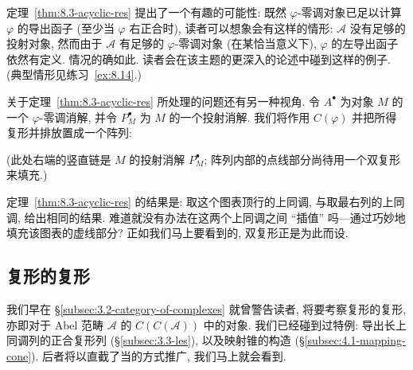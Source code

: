 定理~\ref{thm:8.3-acyclic-res} 提出了一个有趣的可能性: 既然 $\varphi$-零调对象已足以计算 $\varphi$ 的导出函子 (至少当 $\varphi$ 右正合时), 读者可以想象会有这样的情形: $\mathcal{A}$ 没有足够的投射对象, 然而由于 $\mathcal{A}$ 有足够的 $\varphi$-零调对象 (在某恰当意义下), $\varphi$ 的左导出函子依然有定义. 情况的确如此. 读者会在该主题的更深入的论述中碰到这样的例子. (典型情形见练习~\ref{ex:8.14}.)

关于定理~\ref{thm:8.3-acyclic-res} 所处理的问题还有另一种视角. 令 $A^\bullet$ 为对象 $M$ 的一个 $\varphi$-零调消解, 并令 $P_M^\bullet$ 为 $M$ 的一个投射消解. 我们将作用 $C(\varphi)$ 并把所得复形并排放置成一个阵列:

\begin{center}
\end{center}

\noindent (此处右端的竖直链是 $M$ 的投射消解 $P_M^\bullet$; 阵列内部的点线部分尚待用一个双复形来填充.)

定理~\ref{thm:8.3-acyclic-res} 的结果是: 取这个图表顶行的上同调, 与取最右列的上同调, 给出相同的结果. 难道就没有办法在这两个上同调之间 ``插值'' 吗---通过巧妙地填充该图表的虚线部分? 正如我们马上要看到的, 双复形正是为此而设.

\subsection{复形的复形}
\label{subsec:8.2-complex-of-complexes}

我们早在 \S\ref{subsec:3.2-category-of-complexes} 就曾警告读者, 将要考察复形的复形, 亦即对于 Abel 范畴 $\mathcal{A}$ 的 $C(C(\mathcal{A}))$ 中的对象. 我们已经碰到过特例: 导出长上同调列的正合复形列 (\S\ref{subsec:3.3-les}), 以及映射锥的构造 (\S\ref{subsec:4.1-mapping-cone}). 后者将以直截了当的方式推广, 我们马上就会看到.

